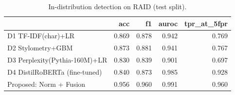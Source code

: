 \begin{table}
\caption{In-distribution detection on RAID (test split).}
\label{tab:table1_in_distribution}
\begin{tabular}{lrrrr}
\toprule
 & acc & f1 & auroc & tpr_at_5fpr \\
\midrule
D1 TF-IDF(char)+LR & 0.869 & 0.878 & 0.942 & 0.769 \\
D2 Stylometry+GBM & 0.873 & 0.881 & 0.941 & 0.767 \\
D3 Perplexity(Pythia-160M)+LR & 0.830 & 0.839 & 0.901 & 0.697 \\
D4 DistilRoBERTa (fine-tuned) & 0.840 & 0.873 & 0.985 & 0.928 \\
Proposed: Norm + Fusion & 0.956 & 0.960 & 0.991 & 0.960 \\
\bottomrule
\end{tabular}
\end{table}
